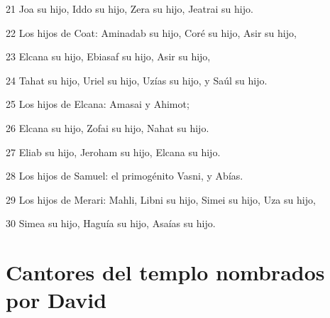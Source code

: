 \par 21 Joa su hijo, Iddo su hijo, Zera su hijo, Jeatrai su hijo.
\par 22 Los hijos de Coat: Aminadab su hijo, Coré su hijo, Asir su hijo,
\par 23 Elcana su hijo, Ebiasaf su hijo, Asir su hijo,
\par 24 Tahat su hijo, Uriel su hijo, Uzías su hijo, y Saúl su hijo.
\par 25 Los hijos de Elcana: Amasai y Ahimot;
\par 26 Elcana su hijo, Zofai su hijo, Nahat su hijo.
\par 27 Eliab su hijo, Jeroham su hijo, Elcana su hijo.
\par 28 Los hijos de Samuel: el primogénito Vasni, y Abías.
\par 29 Los hijos de Merari: Mahli, Libni su hijo, Simei su hijo, Uza su hijo,
\par 30 Simea su hijo, Haguía su hijo, Asaías su hijo.

\section*{Cantores del templo nombrados por David}

